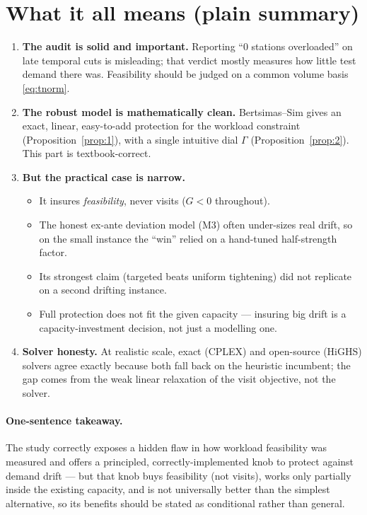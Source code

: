 \documentclass[11pt]{article}
\theoremstyle{definition}
\theoremstyle{plain}
\theoremstyle{remark}
\begin{document}
\section{What it all means (plain summary)}

\begin{enumerate}
  \item \textbf{The audit is solid and important.} Reporting ``$0$ stations
  overloaded'' on late temporal cuts is misleading; that verdict mostly measures
  how little test demand there was. Feasibility should be judged on a common
  volume basis \eqref{eq:tnorm}.
  \item \textbf{The robust model is mathematically clean.} Bertsimas--Sim gives
  an exact, linear, easy-to-add protection for the workload constraint
  (Proposition~\ref{prop:1}), with a single intuitive dial $\Gamma$
  (Proposition~\ref{prop:2}). This part is textbook-correct.
  \item \textbf{But the practical case is narrow.}
  \begin{itemize}[nosep]
    \item It insures \emph{feasibility}, never visits ($G<0$ throughout).
    \item The honest ex-ante deviation model (M3) often under-sizes real drift,
    so on the small instance the ``win'' relied on a hand-tuned half-strength
    factor.
    \item Its strongest claim (targeted beats uniform tightening) did not
    replicate on a second drifting instance.
    \item Full protection does not fit the given capacity --- insuring big drift
    is a capacity-investment decision, not just a modelling one.
  \end{itemize}
  \item \textbf{Solver honesty.} At realistic scale, exact (CPLEX) and
  open-source (HiGHS) solvers agree exactly because both fall back on the
  heuristic incumbent; the gap comes from the weak linear relaxation of the visit
  objective, not the solver.
\end{enumerate}

\paragraph{One-sentence takeaway.}
The study correctly exposes a hidden flaw in how workload feasibility was
measured and offers a principled, correctly-implemented knob to protect against
demand drift --- but that knob buys feasibility (not visits), works only
partially inside the existing capacity, and is not universally better than the
simplest alternative, so its benefits should be stated as conditional rather than
general.
\end{document}
